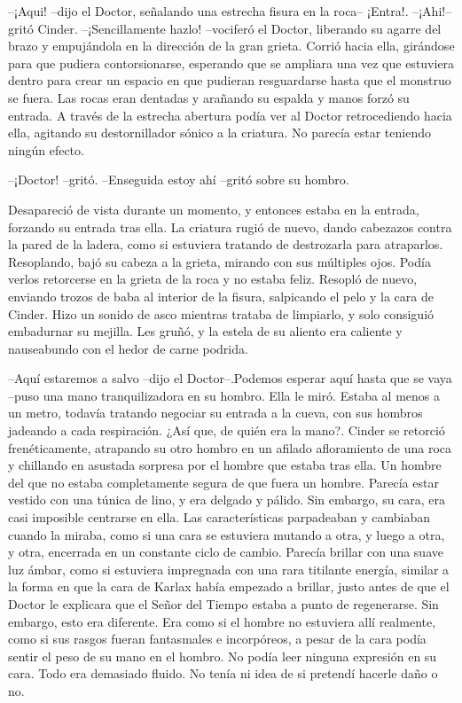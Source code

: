 --¡Aqui! --dijo el Doctor, señalando una estrecha fisura en la roca-- ¡Entra!.
--¡Ahi!-- gritó Cinder.
--¡Sencillamente hazlo! --vociferó el Doctor, liberando su agarre del brazo y empujándola en la dirección de la gran grieta. Corrió hacia ella, girándose para que pudiera contorsionarse, esperando que se ampliara una vez que estuviera dentro para crear un espacio en que pudieran resguardarse hasta que el monstruo se fuera.
Las rocas eran dentadas y arañando su espalda y manos forzó su entrada. A través de la estrecha abertura podía ver al Doctor retrocediendo hacia ella, agitando su destornillador sónico a la criatura. No parecía estar teniendo ningún efecto. 

--¡Doctor! --gritó.
--Enseguida estoy ahí --gritó sobre su hombro.

Desapareció de vista durante un momento, y entonces estaba en la entrada, forzando su entrada tras ella.
La criatura rugió de nuevo, dando cabezazos contra la pared de la ladera, como si estuviera tratando de destrozarla para atraparlos. Resoplando, bajó su cabeza a la grieta, mirando con sus múltiples ojos. Podía verlos retorcerse en la grieta de la roca y no estaba feliz. Resopló de nuevo, enviando trozos de baba al interior de la fisura, salpicando el pelo y la cara de Cinder. Hizo un sonido de asco mientras trataba de limpiarlo, y solo consiguió embadurnar su mejilla. Les gruñó, y la estela de su aliento era caliente y nauseabundo con el hedor de carne podrida.

--Aquí estaremos a salvo --dijo el Doctor--.Podemos esperar aquí hasta que se vaya --puso una mano tranquilizadora en su hombro. Ella le miró. Estaba al menos a un metro, todavía tratando negociar su entrada a la cueva, con sus hombros jadeando a cada respiración. ¿Así que, de quién era la mano?.
Cinder se retorció frenéticamente, atrapando su otro hombro en un afilado afloramiento de una roca y chillando en asustada sorpresa por el hombre que estaba tras ella. Un hombre del que no estaba completamente segura de que fuera un hombre.
Parecía estar vestido con una túnica de lino, y era delgado y pálido. Sin embargo, su cara, era casi imposible centrarse en ella. Las características parpadeaban y cambiaban cuando la miraba, como si una cara se estuviera mutando a otra, y luego a otra, y otra, encerrada en un constante ciclo de cambio. Parecía brillar con una suave luz ámbar, como si estuviera impregnada con una rara titilante energía, similar a la forma en que la cara de Karlax había empezado a brillar, justo antes de que el Doctor le explicara que el Señor del Tiempo estaba a punto de regenerarse.
Sin embargo, esto era diferente. Era como si el hombre no estuviera allí realmente, como si sus rasgos fueran fantasmales e incorpóreos, a pesar de la cara podía sentir el peso de su mano en el hombro. No podía leer ninguna expresión en su cara. Todo era demasiado fluido. No tenía ni idea de si pretendí hacerle daño o no.

